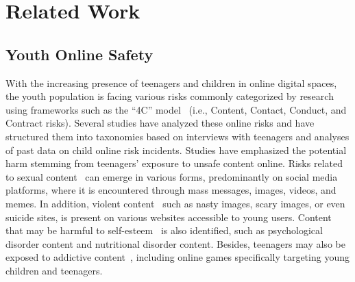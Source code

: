 \vspace{-8pt}
\section{Related Work}
\vspace{-3pt}
\label{sec:related}

\subsection{Youth Online Safety}
\vspace{-3pt}
With the increasing presence of teenagers and children in online digital spaces, the youth population is facing various risks commonly categorized by research using frameworks such as the ``4C'' model~\cite{livingstone2014their} (i.e., Content, Contact, Conduct, and Contract risks). Several studies have analyzed these online risks and have structured them into taxonomies based on interviews with teenagers and analyses of past data on child online risk incidents.
Studies have emphasized the potential harm stemming from teenagers' exposure to unsafe content online.
Risks related to sexual content~\cite{staksrud2013does, mascheroni2014net, ChildSafetySmartHome} can emerge in various forms, predominantly on social media platforms, where it is encountered through mass messages, images, videos, and memes. 
In addition, violent content~\cite{livingstone2008risky} such as nasty images, scary images, or even suicide sites, is present on various websites accessible to young users.  
Content that may be harmful to self-esteem~\cite{tsirtsis2016cyber} is also identified, such as psychological disorder content and nutritional disorder content. Besides, teenagers may also be exposed to addictive content~\cite{tsirtsis2016cyber}, including online games specifically targeting young children and teenagers. 

